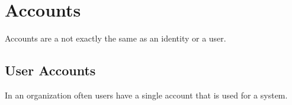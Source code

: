 \hypertarget{accounts}{%
\chapter{Accounts}\label{accounts}}

Accounts are a not exactly the same as an identity or a user.

\hypertarget{user-accounts}{%
\section{User Accounts}\label{user-accounts}}

In an organization often users have a single account that is used for a
system.
